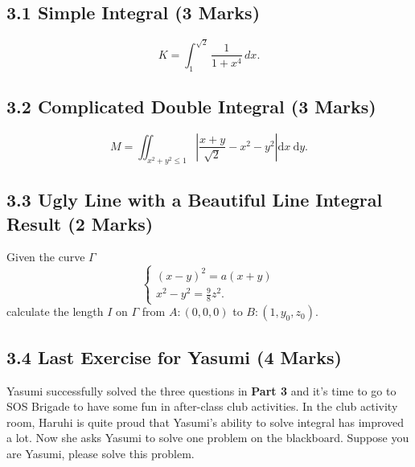 \documentclass[12pt]{article}
\begin{document}
\subsection*{3.1 Simple Integral (3 Marks)}
\begin{equation*}
    K = \int^{\sqrt{2}}_{1} \frac{1}{1 + x^4}\,dx. 
\end{equation*}

\subsection*{3.2 Complicated Double Integral (3 Marks)}
\begin{equation*}
    M=\iint_{x^{2}+y^{2} \leqslant 1}\left|\frac{x+y}{\sqrt{2}}-x^{2}-y^{2}\right| \mathrm{d} x \mathrm{~d} y.
\end{equation*}

\subsection*{3.3 Ugly Line with a Beautiful Line Integral Result (2 Marks)}
Given the curve $\Gamma$
\begin{equation*}
    \left\{\begin{array}{l}
(x-y)^{2}=a(x+y) \\
x^{2}-y^{2}=\frac{9}{8} z^{2}. 
\end{array}\right.
\end{equation*}
calculate the length $I$ on $\Gamma$ from $A:\left(0, 0, 0\right)$ to $B:\left(1, y_0, z_0\right)$. 

\subsection*{3.4 Last Exercise for Yasumi (4 Marks)}
\par Yasumi successfully solved the three questions in \textbf{Part 3} and it's time to go to SOS Brigade to have some fun in after-class club activities. In the club activity room, Haruhi is quite proud that Yasumi's ability to solve integral has improved a lot. Now she asks Yasumi to solve one problem on the blackboard. Suppose you are Yasumi, please solve this problem.
\end{document}
